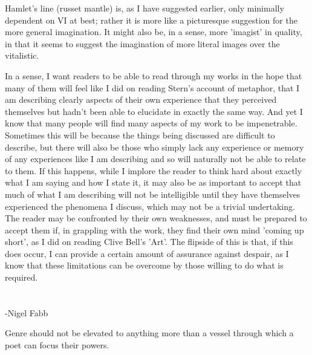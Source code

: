 \documentclass[]{article}
\begin{document}
Hamlet's line (russet mantle) is, as I have suggested earlier, only minimally dependent on VI at best; rather it is more like a picturesque suggestion for the more general imagination. It might also be, in a sense, more 'imagist' in quality, in that it seems to suggest the imagination of more literal images over the vitalistic.



In a sense, I want readers to be able to read through my works in the hope that many of them will feel like I did on reading Stern's account of metaphor, that I am describing clearly aspects of their own experience that they perceived themselves but hadn't been able to elucidate in exactly the same way. And yet I know that many people will find many aspects of my work to be impenetrable. Sometimes this will be because the things being discussed are difficult to describe, but there will also be those who simply lack any experience or memory of any experiences like I am describing and so will naturally not be able to relate to them. If this happens, while I implore the reader to think hard about exactly what I am saying and how I state it, it may also be as important to accept that much of what I am describing will not be intelligible until they have themselves experienced the phenomena I discuss, which may not be a trivial undertaking. The reader may be confronted by their own weaknesses, and must be prepared to accept them if, in grappling with the work, they find their own mind 'coming up short', as I did on reading Clive Bell's 'Art'. The flipside of this is that, if this does occur, I can provide a certain amount of assurance against despair, as I know that these limitations can be overcome by those willing to do what is required.



\section{}



-Nigel Fabb



Genre should not be elevated to anything more than a vessel through which a poet can focus their powers.



\section{}
\end{document}
